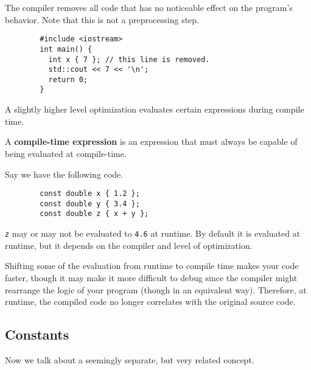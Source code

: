 \documentclass{article}
\begin{document}
    \begin{definition}
      The compiler removes all code that has no noticeable effect on the program's behavior. Note that this is not a preprocessing step. 
      \begin{lstlisting}
        #include <iostream>
        int main() {
          int x { 7 }; // this line is removed. 
          std::cout << 7 << '\n';
          return 0;
        } 
      \end{lstlisting}
    \end{definition} 

    A slightly higher level optimization evaluates certain expressions during compile time. 

    \begin{definition}
      A \textbf{compile-time expression} is an expression that must always be capable of being evaluated at compile-time. 
    \end{definition}

    \begin{example}
      Say we have the following code. 
      \begin{lstlisting}
        const double x { 1.2 };
        const double y { 3.4 };
        const double z { x + y }; 
      \end{lstlisting} 
      \texttt{z} may or may not be evaluated to \texttt{4.6} at runtime. By default it is evaluated at runtime, but it depends on the compiler and level of optimization. 
    \end{example}

    Shifting some of the evaluation from runtime to compile time makes your code faster, though it may make it more difficult to debug since the compiler might rearrange the logic of your program (though in an equivalent way). Therefore, at runtime, the compiled code no longer correlates with the original source code. 
  
  \subsection{Constants}

    Now we talk about a seemingly separate, but very related concept. 
\end{document}
